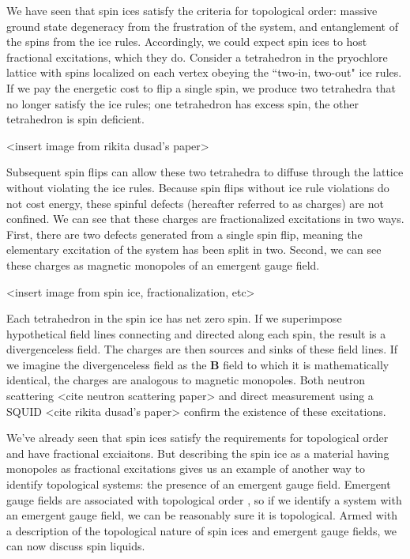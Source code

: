 We have seen that spin ices satisfy the criteria for topological order: massive ground state degeneracy from the frustration of the system, and entanglement of the spins from the ice rules. Accordingly, we could expect spin ices to host fractional excitations, which they do. Consider a tetrahedron in the pryochlore lattice with spins localized on each vertex obeying the ``two-in, two-out" ice rules. If we pay the energetic cost to flip a single spin, we produce two tetrahedra that no longer satisfy the ice rules; one tetrahedron has excess spin, the other tetrahedron is spin deficient.

<insert image from rikita dusad's paper>

Subsequent spin flips can allow these two tetrahedra to diffuse through the lattice without violating the ice rules. Because spin flips without ice rule violations do not cost energy, these spinful defects (hereafter referred to as charges) are not confined. We can see that these charges are fractionalized excitations in two ways. First, there are two defects generated from a single spin flip, meaning the elementary excitation of the system has been split in two. Second, we can see these charges as magnetic monopoles of an emergent gauge field.

<insert image from spin ice, fractionalization, etc>

Each tetrahedron in the spin ice has net zero spin. If we superimpose hypothetical field lines connecting and directed along each spin, the result is a divergenceless field. The charges are then sources and sinks of these field lines. If we imagine the divergenceless field as the \textbf{B} field to which it is mathematically identical, the charges are analogous to magnetic monopoles. Both neutron scattering <cite neutron scattering paper> and direct measurement using a SQUID <cite rikita dusad's paper> confirm the existence of these excitations.

We've already seen that spin ices satisfy the requirements for topological order and have fractional exciaitons. But describing the spin ice as a material having monopoles as fractional excitations gives us an example of another way to identify topological systems: the presence of an emergent gauge field. Emergent gauge fields are associated with topological order \cite{Sachdev2019}, so if we identify a system with an emergent gauge field, we can be reasonably sure it is topological. Armed with a description of the topological nature of spin ices and emergent gauge fields, we can now discuss spin liquids.

